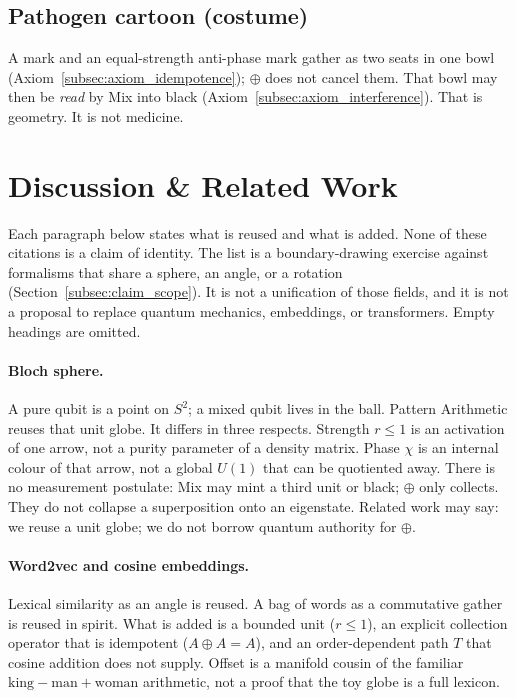 \documentclass[12pt, a4paper]{article}
\begin{document}
\subsection{Pathogen cartoon (costume)}
A mark and an equal-strength anti-phase mark gather as two seats in
one bowl (Axiom~\ref{subsec:axiom_idempotence}); $\oplus$ does not
cancel them. That bowl may then be \emph{read} by Mix into black
(Axiom~\ref{subsec:axiom_interference}). That is geometry. It is not
medicine.

\section{Discussion \& Related Work}
\label{sec:related}

Each paragraph below states what is reused and what is added. None of
these citations is a claim of identity. The list is a
boundary-drawing exercise against formalisms that share a sphere, an
angle, or a rotation
(Section~\ref{subsec:claim_scope}). It is not a unification of those
fields, and it is not a proposal to replace quantum mechanics,
embeddings, or transformers. Empty headings are omitted.

\paragraph{Bloch sphere.}
A pure qubit is a point on $S^2$; a mixed qubit lives in the ball.
Pattern Arithmetic reuses that unit globe. It differs in three
respects. Strength $r\le 1$ is an activation of one arrow, not a purity
parameter of a density matrix. Phase $\chi$ is an internal colour of
that arrow, not a global $U(1)$ that can be quotiented away. There is
no measurement postulate: Mix may mint a third unit or black; $\oplus$
only collects. They do not collapse a superposition onto an eigenstate. Related work
may say: we reuse a unit globe; we do not borrow quantum authority for
$\oplus$.

\paragraph{Word2vec and cosine embeddings.}
Lexical similarity as an angle is reused. A bag of words as a
commutative gather is reused in spirit. What is added is a bounded unit
($r\le 1$), an explicit collection operator that is idempotent
($A\oplus A=A$), and an order-dependent path $T$ that cosine addition
does not supply. Offset is a manifold cousin of the familiar
$\mathrm{king}-\mathrm{man}+\mathrm{woman}$ arithmetic, not a proof
that the toy globe is a full lexicon.
\end{document}
